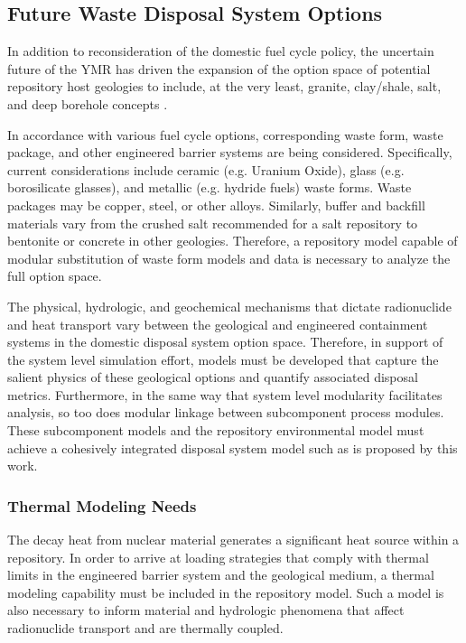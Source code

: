 \subsection{Future Waste Disposal System Options}


In addition to reconsideration of the domestic fuel cycle policy, the uncertain 
future of the \gls{YMR} has driven the expansion of the option space of 
potential repository host geologies to include, at the very least, granite, 
clay/shale, salt, and deep borehole concepts \cite{nutt_used_2010}. 


In accordance with various fuel cycle options, corresponding waste form, waste 
package, and other engineered barrier systems are being considered.  
Specifically, current considerations include ceramic (e.g.  Uranium Oxide), 
glass (e.g.  borosilicate glasses), and metallic (e.g.  hydride fuels) waste 
forms. Waste packages may be copper, steel, or other alloys. Similarly, buffer 
and backfill materials vary from the crushed salt recommended for a salt 
repository to bentonite or concrete in other geologies. Therefore, a repository  
model capable of modular substitution of waste form models and data is
necessary to analyze the full option space.


The physical, hydrologic, and geochemical mechanisms that dictate 
radionuclide and heat transport vary between the geological and engineered 
containment systems in the domestic disposal system option space.  Therefore, 
in support of the system level simulation effort, models must be developed that 
capture the salient physics of these geological options and quantify associated 
disposal metrics.  Furthermore, in the same way that system level 
modularity facilitates analysis, so too does modular linkage between subcomponent 
process modules. These subcomponent models and the repository environmental model 
must achieve a cohesively integrated disposal system model such as is proposed by 
this work. 


\subsubsection{Thermal Modeling Needs}
The decay heat from nuclear material generates a significant heat source within a 
repository. In order to arrive at loading strategies that comply with thermal 
limits in the engineered barrier system and the geological medium, a thermal 
modeling capability must be included in the repository model. Such a model is 
also necessary to inform material and hydrologic phenomena that affect 
radionuclide transport and are thermally coupled. 

